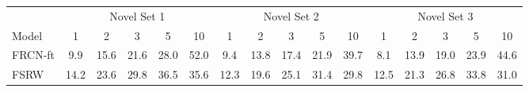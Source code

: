 \documentclass{article}
\begin{document}
\renewcommand{\tabcolsep}{5.0pt}
\begin{table*}[t]
\centering
{
\resizebox{\textwidth}{!}
{
\begin{tabular}{l|l|l|c|ccccc|ccccc|ccccc}
\toprule[1.1pt]
\multicolumn{4}{l}{}  & \multicolumn{5}{c}{Novel Set 1}  & \multicolumn{5}{c}{Novel Set 2}  & \multicolumn{5}{c}{Novel Set 3}  \\
\cmidrule(lr){5-9}\cmidrule(lr){10-14}\cmidrule(lr){15-19}
\multicolumn{4}{l|}{\multirow{-2}{*}{Model}} & 1 & 2  & 3  & 5  & 10  & 1  & 2 & 3 & 5  & 10 & 1 & 2  & 3 & 5  & 10  \\

\midrule[0.9pt]
\multicolumn{4}{l|}{FRCN-ft \cite{yan2019meta}}       & 9.9         & 15.6          & 21.6          & 28.0          & 52.0          & 9.4           & 13.8          & 17.4          & 21.9          & 39.7          & 8.1           & 13.9          & 19.0          & 23.9          & 44.6          \\
\multicolumn{4}{l|}{FSRW \cite{kang2019few}}               & 14.2          & 23.6         & 29.8          & 36.5          & 35.6          & 12.3          & 19.6          & 25.1          & 31.4          & 29.8          & 12.5          & 21.3          & 26.8          & 33.8          & 31.0          \\


\end{tabular}}}
\end{table*}
\end{document}
